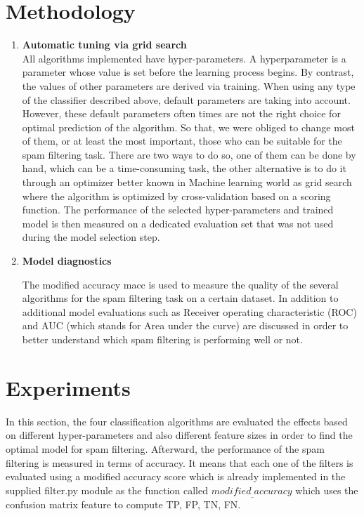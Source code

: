 \documentclass[journal]{IEEEtran}
\begin{document}


\section{Methodology}
\begin{enumerate}
\item \textbf{Automatic tuning via grid search}\\
All algorithms implemented have hyper-parameters. A hyperparameter is a parameter whose value is set before the learning process begins. By contrast, the values of other parameters are derived via training. When using any type of the classifier described above, default parameters are taking into account. However, these default parameters often times are not the right choice for optimal prediction of the algorithm. So that, we were obliged to change most of them, or at least the most important, those who can be suitable for the spam filtering task. 
There are two ways to do so, one of them can be done by hand, which can be a time-consuming task, the other alternative is to do it through an optimizer better known in Machine learning world as grid search where the algorithm is optimized by cross-validation based on a scoring function. The performance of the selected hyper-parameters and trained model is then measured on a dedicated evaluation set that was not used during the model selection step.
\item \textbf{Model diagnostics}

The modified accuracy macc is used to measure the quality of the several algorithms for the spam filtering task on a certain dataset. In addition to additional model evaluations such as Receiver operating characteristic (ROC) and AUC (which stands for Area under the curve) are discussed in order to better understand which spam filtering is performing well or not.

\end{enumerate}


\section{Experiments}

In this section, the four classification algorithms are evaluated the effects based on different hyper-parameters and also different feature sizes in order to find the optimal model for spam filtering. Afterward, the  performance of the spam filtering is measured in terms of accuracy. It means that each one of the filters is evaluated using a modified accuracy score which is already implemented in the supplied filter.py module as the function called $modified_{\_}accuracy$ which uses the confusion matrix feature to compute TP, FP, TN, FN.
\end{document}
